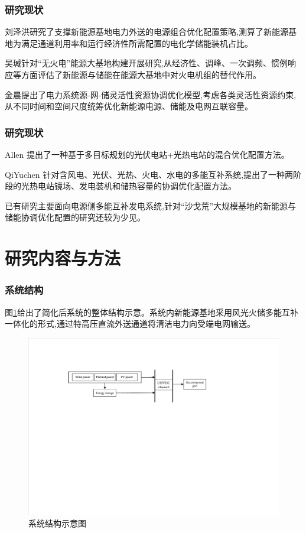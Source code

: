 \documentclass{beamer}
\begin{document}
\begin{frame}
	\frametitle{研究现状} 
	\qquad 刘泽洪研究了支撑新能源基地电力外送的电源组合优化配置策略,测算了新能源基地为满足通道利用率和运行经济性所需配置的电化学储能装机占比。

	\qquad 吴瑊针对“无火电”能源大基地构建开展研究,从经济性、调峰、一次调频、惯例响应等方面评估了新能源与储能在能源大基地中对火电机组的替代作用。
	
	\qquad 金晨提出了电力系统源-网-储灵活性资源协调优化模型,考虑各类灵活性资源约束,从不同时间和空间尺度统筹优化新能源电源、储能及电网互联容量。
\end{frame}

\begin{frame}
	\frametitle{研究现状} 
	\qquad Allen 提出了一种基于多目标规划的光伏电站+光热电站的混合优化配置方法。
	
	\qquad QiYuchen 针对含风电、光伏、光热、火电、水电的多能互补系统,提出了一种两阶段的光热电站镜场、发电装机和储热容量的协调优化配置方法。

	\qquad 已有研究主要面向电源侧多能互补发电系统,针对“沙戈荒”大规模基地的新能源与储能协调优化配置的研究还较为少见。
\end{frame}

\section{研究内容与方法}

\begin{frame}
	\frametitle{系统结构} 
	\qquad 图\ref*{fig.1}给出了简化后系统的整体结构示意。系统内新能源基地采用风光火储多能互补一体化的形式,通过特高压直流外送通道将清洁电力向受端电网输送。
	\begin{figure}[htbp]
		\centering
		\includegraphics[scale=0.6]{./pic/系统结构示意图.pdf}
		\caption{系统结构示意图}
		\label{fig.1}
	\end{figure}
\end{frame}
\end{document}
